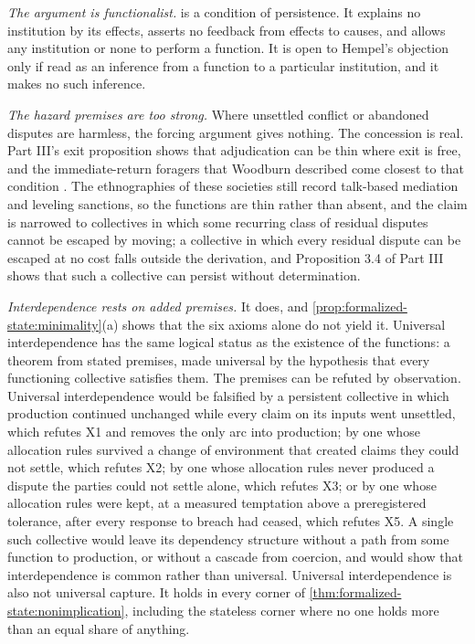 \documentclass[11pt,letterpaper]{article}
\theoremstyle{definition}
\theoremstyle{remark}
\begin{document}
\emph{The argument is functionalist.}  is a condition of persistence. It explains no institution by its effects, asserts no feedback from effects to causes, and allows any institution or none to perform a function. It is open to Hempel's objection only if read as an inference from a function to a particular institution, and it makes no such inference.

\emph{The hazard premises are too strong.} Where unsettled conflict or abandoned disputes are harmless, the forcing argument gives nothing. The concession is real. Part III's exit proposition shows that adjudication can be thin where exit is free, and the immediate-return foragers that Woodburn described come closest to that condition \citep{woodburn1982}. The ethnographies of these societies still record talk-based mediation and leveling sanctions, so the functions are thin rather than absent, and the claim is narrowed to collectives in which some recurring class of residual disputes cannot be escaped by moving; a collective in which every residual dispute can be escaped at no cost falls outside the derivation, and Proposition 3.4 of Part III shows that such a collective can persist without determination.

\emph{Interdependence rests on added premises.} It does, and \cref{prop:formalized-state:minimality}(a) shows that the six axioms alone do not yield it. Universal interdependence has the same logical status as the existence of the functions: a theorem from stated premises, made universal by the hypothesis that every functioning collective satisfies them. The premises can be refuted by observation. Universal interdependence would be falsified by a persistent collective in which production continued unchanged while every claim on its inputs went unsettled, which refutes X1 and removes the only arc into production; by one whose allocation rules survived a change of environment that created claims they could not settle, which refutes X2; by one whose allocation rules never produced a dispute the parties could not settle alone, which refutes X3; or by one whose allocation rules were kept, at a measured temptation above a preregistered tolerance, after every response to breach had ceased, which refutes X5. A single such collective would leave its dependency structure without a path from some function to production, or without a cascade from coercion, and would show that interdependence is common rather than universal. Universal interdependence is also not universal capture. It holds in every corner of \cref{thm:formalized-state:nonimplication}, including the stateless corner where no one holds more than an equal share of anything.
\end{document}
